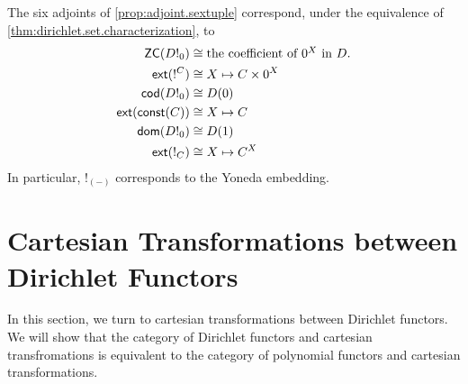 \begin{rmk}
The six adjoints of \cref{prop:adjoint.sextuple} correspond, under
the equivalence of \cref{thm:dirichlet.set.characterization}, to
\begin{align*}
  \mathsf{{ZC}}(D!_0) &\cong \mbox{the coefficient of $0^X$ in $D$.}\\
  \operatorname{\mathsf{{ext}}}(!^{C}) &\cong X \mapsto C \times 0^X \\
  \operatorname{\mathsf{{cod}}}(D!_0) &\cong D(0) \\
  \operatorname{\mathsf{{ext}}}( \mathsf{{const}}(C) ) &\cong X \mapsto C \\
  \operatorname{\mathsf{{dom}}}(D!_0) &\cong D(1) \\
  \operatorname{\mathsf{{ext}}}( !_{C} ) &\cong X \mapsto C^X 
\end{align*}
 In particular, $!_{(-)}$ corresponds to the Yoneda embedding.
\end{rmk}

\section{Cartesian Transformations between Dirichlet Functors}
In this section, we turn to cartesian transformations between Dirichlet
functors. We will show that the category of Dirichlet functors and cartesian
transfromations is equivalent to the category of polynomial functors and
cartesian transformations.

